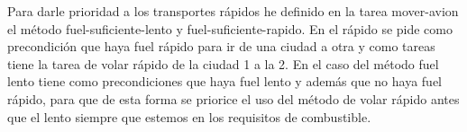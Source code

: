 \documentclass[12pt,a4paper]{article}
\begin{document}
Para darle prioridad a los transportes rápidos he definido en la tarea mover-avion el método fuel-suficiente-lento y fuel-suficiente-rapido. En el rápido se pide como precondición que haya fuel rápido para ir de una ciudad a otra y como tareas tiene la tarea de volar rápido de la ciudad 1 a la 2. En el caso del método fuel lento tiene como precondiciones que haya fuel lento y además que no haya fuel rápido, para que de esta forma se priorice el uso del método de volar rápido antes que el lento siempre que estemos en los requisitos de combustible.
\end{document}
